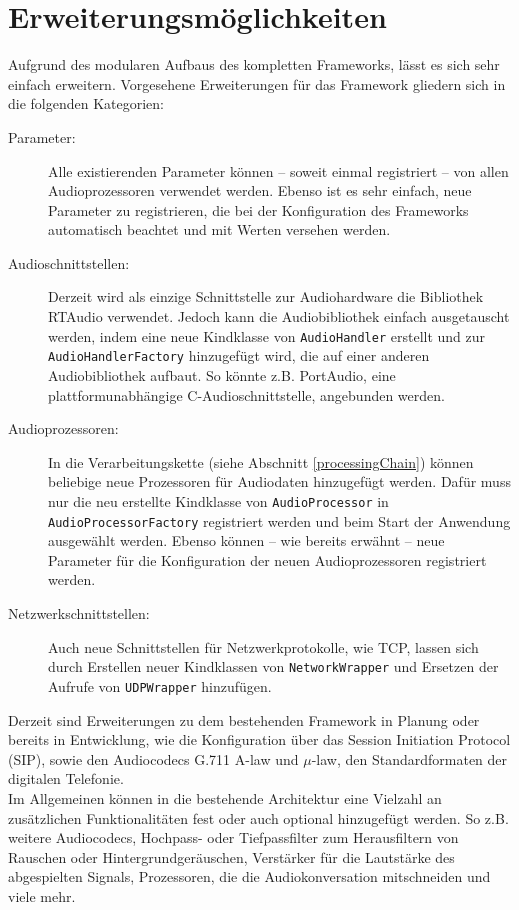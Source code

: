 \section{Erweiterungsmöglichkeiten}
Aufgrund des modularen Aufbaus des kompletten Frameworks, lässt es sich sehr einfach erweitern. Vorgesehene Erweiterungen für das Framework gliedern sich in die folgenden Kategorien:
\begin{description}
\item[Parameter:] Alle existierenden Parameter können -- soweit einmal registriert -- von allen Audioprozessoren verwendet werden. Ebenso ist es sehr einfach, neue Parameter zu registrieren, die bei der Konfiguration des Frameworks automatisch beachtet und mit Werten versehen werden.
\item[Audioschnittstellen:] Derzeit wird als einzige Schnittstelle zur Audiohardware die Bibliothek RTAudio verwendet. Jedoch kann die Audiobibliothek einfach ausgetauscht werden, indem eine neue Kindklasse von \texttt{AudioHandler} erstellt und zur \texttt{AudioHandlerFactory} hinzugefügt wird, die auf einer anderen Audiobibliothek aufbaut. So könnte z.B. PortAudio, eine plattformunabhängige C-Audioschnittstelle, angebunden werden.
\item[Audioprozessoren:] In die Verarbeitungskette (siehe Abschnitt \ref{processingChain}) können beliebige neue Prozessoren für Audiodaten hinzugefügt werden. Dafür muss nur die neu erstellte Kindklasse von \texttt{AudioProcessor} in \texttt{AudioProcessorFactory} registriert werden und beim Start der Anwendung ausgewählt werden. Ebenso können -- wie bereits erwähnt -- neue Parameter für die Konfiguration der neuen Audioprozessoren registriert werden.
\item[Netzwerkschnittstellen:] Auch neue Schnittstellen für Netzwerkprotokolle, wie TCP, lassen sich durch Erstellen neuer Kindklassen von \texttt{NetworkWrapper} und Ersetzen der Aufrufe von \texttt{UDPWrapper} hinzufügen.
\end{description}
Derzeit sind Erweiterungen zu dem bestehenden Framework in Planung oder bereits in Entwicklung, wie die Konfiguration über das Session Initiation Protocol (SIP), sowie den Audiocodecs G.711 A-law und $\mu$-law, den Standardformaten der digitalen Telefonie.
\\
Im Allgemeinen können in die bestehende Architektur eine Vielzahl an zusätzlichen Funktionalitäten fest oder auch optional hinzugefügt werden. So z.B. weitere Audiocodecs, Hochpass- oder Tiefpassfilter zum Herausfiltern von Rauschen oder Hintergrundgeräuschen, Verstärker für die Lautstärke des abgespielten Signals, Prozessoren, die die Audiokonversation mitschneiden und viele mehr.